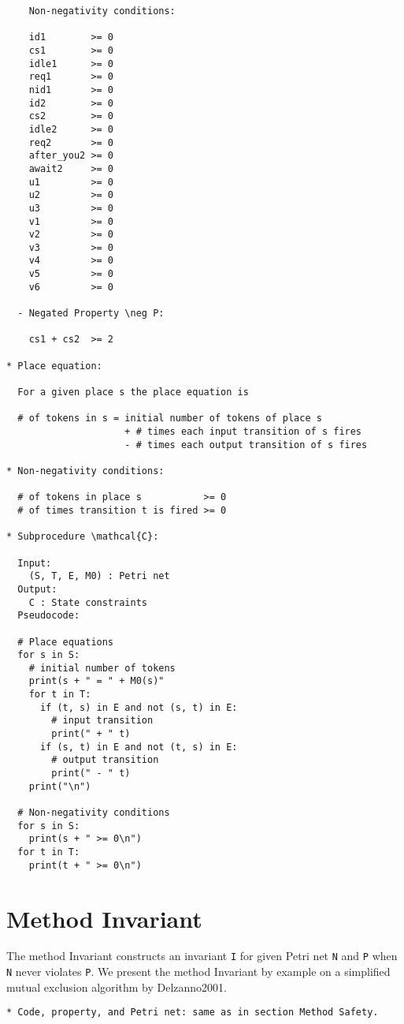\documentclass{article}
\begin{document}
\begin{verbatim}
    Non-negativity conditions:
  
    id1        >= 0
    cs1        >= 0
    idle1      >= 0
    req1       >= 0
    nid1       >= 0
    id2        >= 0
    cs2        >= 0
    idle2      >= 0
    req2       >= 0
    after_you2 >= 0
    await2     >= 0
    u1         >= 0
    u2         >= 0
    u3         >= 0
    v1         >= 0
    v2         >= 0
    v3         >= 0
    v4         >= 0
    v5         >= 0
    v6         >= 0

  - Negated Property \neg P:

    cs1 + cs2  >= 2

* Place equation:
  
  For a given place s the place equation is

  # of tokens in s = initial number of tokens of place s
                     + # times each input transition of s fires
                     - # times each output transition of s fires

* Non-negativity conditions:

  # of tokens in place s           >= 0
  # of times transition t is fired >= 0

* Subprocedure \mathcal{C}:

  Input:
    (S, T, E, M0) : Petri net
  Output:
    C : State constraints
  Pseudocode:
  
  # Place equations
  for s in S:
    # initial number of tokens
    print(s + " = " + M0(s)"
    for t in T:
      if (t, s) in E and not (s, t) in E:
        # input transition
        print(" + " t)
      if (s, t) in E and not (t, s) in E:
        # output transition
        print(" - " t)
    print("\n")
  
  # Non-negativity conditions
  for s in S:
    print(s + " >= 0\n")
  for t in T:
    print(t + " >= 0\n")
\end{verbatim}

\iffalse

\newpage
\section{Method Invariant}

The method Invariant constructs an invariant \verb=I= for given Petri net \verb=N= and \verb=P= when \verb=N= never violates \verb=P=.
We present the method Invariant by example on a simplified mutual exclusion algorithm by Delzanno2001.

\begin{verbatim}
* Code, property, and Petri net: same as in section Method Safety.
\end{verbatim}
\end{document}
